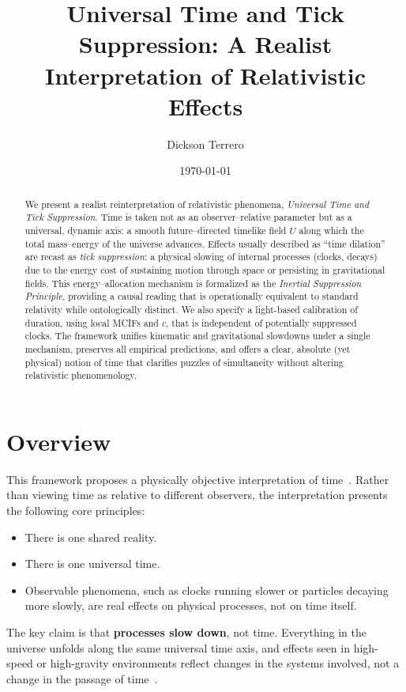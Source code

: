 \documentclass[12pt]{article}
\title{Universal Time and Tick Suppression: A Realist Interpretation of Relativistic Effects}
\author{Dickson Terrero}
\date{\today}
\theoremstyle{plain} %
\begin{document}
\maketitle
\begin{abstract}
We present a realist reinterpretation of relativistic phenomena, \emph{Universal Time and Tick Suppression}. Time is taken not as an observer–relative parameter but as a universal, dynamic axis: a smooth future–directed timelike field \(U\) along which the total mass–energy of the universe advances. Effects usually described as “time dilation” are recast as \emph{tick suppression}: a physical slowing of internal processes (clocks, decays) due to the energy cost of sustaining motion through space or persisting in gravitational fields. This energy–allocation mechanism is formalized as the \emph{Inertial Suppression Principle}, providing a causal reading that is operationally equivalent to standard relativity while ontologically distinct. We also specify a light-based calibration of duration, using local MCIFs and \(c\), that is independent of potentially suppressed clocks. The framework unifies kinematic and gravitational slowdowns under a single mechanism, preserves all empirical predictions, and offers a clear, absolute (yet physical) notion of time that clarifies puzzles of simultaneity without altering relativistic phenomenology.
\end{abstract}

\section*{Overview}

This framework proposes a physically objective interpretation of time~\cite{Einstein1905}. Rather than viewing time as relative to different observers, the interpretation presents the following core principles:

\begin{itemize}
  \item There is one shared reality.
  \item There is one universal time.
  \item Observable phenomena, such as clocks running slower or particles decaying more slowly, are real effects on physical processes, not on time itself.
\end{itemize}

\noindent The key claim is that \textbf{processes slow down}, not time. Everything in the universe unfolds along the same universal time axis, and effects seen in high-speed or high-gravity environments reflect changes in the systems involved, not a change in the passage of time~\cite{Rindler2006, Carroll2004}.
\end{document}
